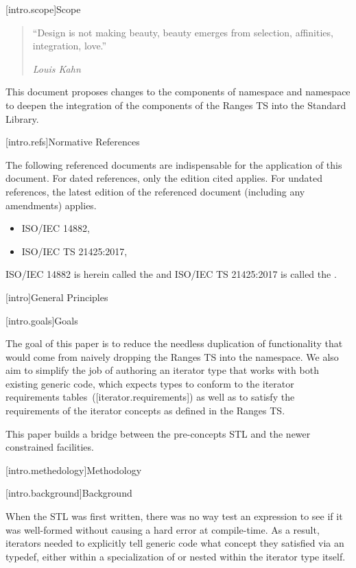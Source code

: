 [intro.scope]{Scope}

\begin{quote}
``Design is not making beauty, beauty emerges from selection, affinities,
integration, love.''
\begin{flushright}
\textemdash \textit{Louis Kahn}
\end{flushright}
\end{quote}

\pnum
This document proposes changes to the components of namespace  and
namespace  to deepen the integration of the components of the
Ranges TS into the Standard Library.

[intro.refs]{Normative References}

\pnum
The following referenced documents are indispensable for the
application of this document. For dated references, only the
edition cited applies. For undated references, the latest edition
of the referenced document (including any amendments) applies.

\begin{itemize}
\item ISO/IEC 14882, 
\item ISO/IEC TS 21425:2017, 
\end{itemize}

ISO/IEC 14882 is herein called the \defn{C\Rplus\Rplus\xspace Standard} and
ISO/IEC TS 21425:2017 is called the .

[intro]{General Principles}

[intro.goals]{Goals}

\pnum
The goal of this paper is to reduce the needless duplication of functionality
that would come from naively dropping the Ranges TS into the 
namespace. We also aim to simplify the job of authoring an iterator type that
works with both existing generic code, which expects types to conform to the
iterator requirements tables~([iterator.requirements]) as well as to satisfy
the requirements of the iterator concepts as defined in the Ranges TS.

This paper builds a bridge between the pre-concepts STL and the newer
constrained facilities.

[intro.methedology]{Methodology}

[intro.background]{Background}

\pnum
When the STL was first written, there was no way test an expression to see if
it was well-formed without causing a hard error at compile-time. As a result,
iterators needed to explicitly tell generic code what concept they satisfied
via an  typedef, either within a specialization of
 or nested within the iterator type itself.

